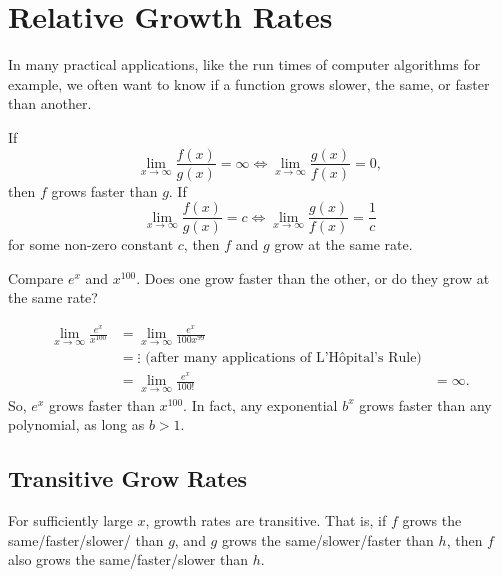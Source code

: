 \section{Relative Growth Rates}
In many practical applications, like the run times of computer algorithms for example, we often want to know if a function grows slower, the same, or faster than another.
\begin{definition}
	If
	\begin{equation*}
		\lim_{x \to \infty}{\frac{f(x)}{g(x)}} = \infty \Leftrightarrow \lim_{x \to \infty}{\frac{g(x)}{f(x)}} = 0,
	\end{equation*}
	then $f$  grows faster than $g$.
	If
	\begin{equation*}
		\lim_{x \to \infty}{\frac{f(x)}{g(x)}} = c \Leftrightarrow \lim_{x \to \infty}{\frac{g(x)}{f(x)}} = \frac{1}{c}
	\end{equation*}
	for some non-zero constant $c$, then $f$ and $g$ grow at the same rate.
\end{definition}

\begin{example}
	Compare $e^x$ and $x^100$.
	Does one grow faster than the other, or do they grow at the same rate?
\end{example}
\begin{align*}
	\lim_{x\to\infty}{\frac{e^x}{x^{100}}} &= \lim_{x\to\infty}{\frac{e^x}{100x^{99}}} \\
	&= \vdots \text{ (after many applications of L'H\^{o}pital's Rule)} \\
	&= \lim_{x\to\infty}{\frac{e^x}{100!}}
	&= \infty.
\end{align*}
\indent
So, $e^x$ grows faster than $x^{100}$.
In fact, any exponential $b^x$ grows faster than any polynomial, as long as $b > 1$.

\subsection{Transitive Grow Rates}
For sufficiently large $x$, growth rates are transitive.
That is, if $f$ grows the same/faster/slower/ than $g$, and $g$ grows the same/slower/faster than $h$, then $f$ also grows the same/faster/slower than $h$.

